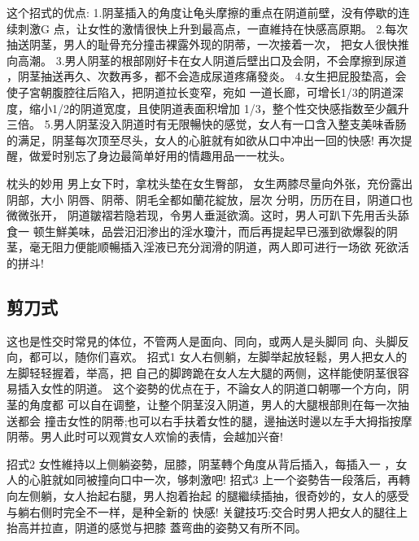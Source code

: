 \documentclass[12pt,UTF8]{ctexbook}
\begin{document}
这个招式的优点:
1.阴茎插入的角度让龟头摩擦的重点在阴道前壁，没有停歇的连续刺激G
点，让女性的激情很快上升到最高点，一直維持在快感高原期。
2.每次抽送阴茎，男人的耻骨充分撞击裸露外现的阴蒂，一次接着一次，
把女人很快推向高潮。
3.男人阴茎的根部刚好卡在女人阴道后壁出口及会阴，不会摩擦到尿道
，阴茎抽送再久、次数再多，都不会造成尿道疼痛發炎。
4.女生把屁股垫高，会使子宮朝腹腔往后陷入，把阴道拉长变窄，宛如
一道长廊，可增长1/3的阴道深度，缩小1/2的阴道宽度，且使阴道表面积增加
1/3，整个性交快感指数至少飆升三倍。
5.男人阴茎没入阴道时有无限暢快的感觉，女人有一口含入整支美味香肠
的满足，阴茎每次顶至尽头，女人的心脏就有如欲从口中冲出一回的快感!
再次提醒，做爱时别忘了身边最简单好用的情趣用品一一枕头。

枕头的妙用
男上女下时，拿枕头垫在女生臀部，
女生两膝尽量向外张，充份露出阴部，大小
阴唇、阴蒂、阴毛全都如蘭花綻放，层次
分明，历历在目，阴道口也微微张开，
阴道皺褶若隐若现，令男人垂涎欲滴。这时，男人可趴下先用舌头舔食一
顿生鮮美味，品尝汩汩渗出的淫水瓊汁，而后再提起早已漲到欲爆裂的阴
茎，毫无阻力便能顺暢插入淫液已充分润滑的阴道，两人即可进行一场欲
死欲活的拼斗!

\subsection{剪刀式}

这也是性交时常見的体位，不管两人是面向、同向，或两人是头脚同
向、头脚反向，都可以，随你们喜欢。
招式1
女人右侧躺，左脚举起放轻鬆，男人把女人的左脚轻轻握着，举高，把
自己的脚跨跪在女人左大腿的两侧，这样能使阴茎很容易插入女性的阴道。
这个姿勢的优点在于，不論女人的阴道口朝哪一个方向，阴茎的角度都
可以自在调整，让整个阴茎沒入阴道，男人的大腿根部則在每一次抽送都会
撞击女性的阴蒂;也可以右手扶着女性的腿，邊抽送时邊以左手大拇指按摩
阴蒂。男人此时可以观賞女人欢愉的表情，会越加兴奋!

招式2
女性維持以上侧躺姿勢，屈膝，阴茎轉个角度从背后插入，每插入一
，女人的心脏就如同被撞向口中一次，够刺激吧!
招式3
上一个姿勢告一段落后，再轉向左侧躺，女人抬起右腿，男人抱着抬起
的腿繼续插抽，很奇妙的，女人的感受与躺右侧时完全不一样，是种全新的
快感!
关鍵技巧:交合时男人把女人的腿往上抬高并拉直，阴道的感觉与把膝
蓋弯曲的姿勢又有所不同。
\end{document}
